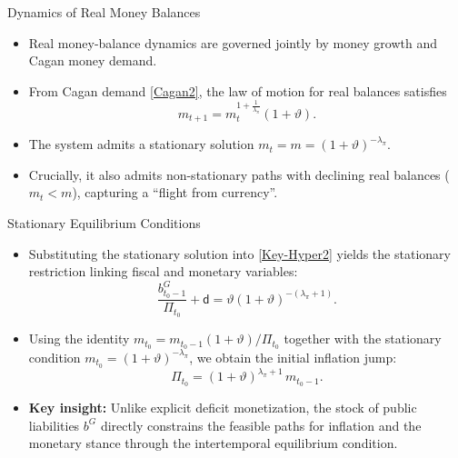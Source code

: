 \documentclass[11pt,aspectratio=169]{beamer}
\begin{document}
\begin{frame}{Dynamics of Real Money Balances}
\small
\begin{itemize}
    \item Real money-balance dynamics are governed jointly by money growth and Cagan money demand.
    \item From Cagan demand \eqref{Cagan2}, the law of motion for real balances satisfies
    \begin{equation}
    m_{t+1}=m_{t}^{1+\frac{1}{\lambda _{\pi }}}(1+\vartheta).
    \label{Cagan3}
    \end{equation}
    \item The system admits a stationary solution \(m_t=m=(1+\vartheta)^{-\lambda_\pi}\).
    \item Crucially, it also admits non-stationary paths with declining real balances (\(m_t<m\)), capturing a \enquote{flight from currency}.
\end{itemize}
\end{frame}

\begin{frame}{Stationary Equilibrium Conditions}
\small
\begin{itemize}
    \item Substituting the stationary solution into \eqref{Key-Hyper2} yields the stationary restriction linking fiscal and monetary variables:
    \begin{equation}
    \frac{b_{t_{0}-1}^{G}}{\Pi _{t_{0}}}+\mathsf{d}
    =\vartheta (1+\vartheta)^{-(\lambda _{\pi }+1)}.
    \label{Eq:I1}
    \end{equation}

    \item Using the identity \(m_{t_0}=m_{t_0-1}(1+\vartheta)/\Pi_{t_0}\) together with the stationary condition
    \(m_{t_0}=(1+\vartheta)^{-\lambda_\pi}\), we obtain the initial inflation jump:
    \[
        \Pi_{t_0}=(1+\vartheta)^{\lambda_\pi+1}\,m_{t_0-1}.
    \]

    \item \textbf{Key insight:} Unlike explicit deficit monetization, the stock of public liabilities \(b^{G}\) directly constrains the feasible paths for inflation and the monetary stance through the intertemporal equilibrium condition.
\end{itemize}
\end{frame}
\end{document}
